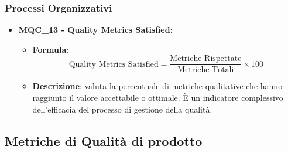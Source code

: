 \subsubsection{Processi Organizzativi}
\begin{itemize}
\item \textbf{MQC\_13 - Quality Metrics Satisfied}:
    \begin{itemize}
        \item \textbf{Formula}:
        \[
            \text{Quality Metrics Satisfied} =
            \frac{\text{Metriche Rispettate}}{\text{Metriche Totali}} \times 100
        \]
        \item \textbf{Descrizione}: valuta la percentuale di metriche qualitative che hanno raggiunto il valore accettabile o ottimale. È un indicatore complessivo dell’efficacia del processo di gestione della qualità.
    \end{itemize}
\end{itemize}

\subsection{Metriche di Qualità di prodotto}

